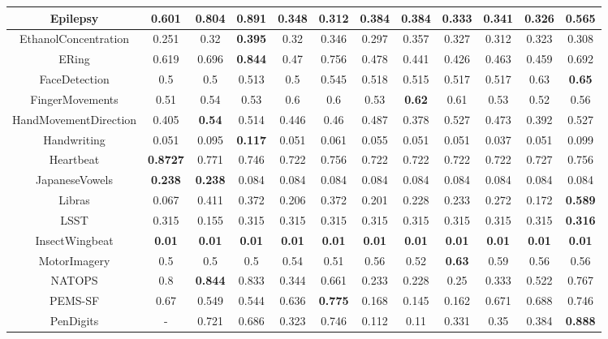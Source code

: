 \documentclass{svproc}
\begin{document}
\begin{table}[ht!]
\begin{adjustbox}{width=1.3\textwidth}
\begin{tabular}{||c@{\hskip 0.1in}c@{\hskip 0.1in}c@{\hskip 0.1in}c@{\hskip 0.1in}c@{\hskip 0.1in}c@{\hskip 0.1in}c@{\hskip 0.1in}c@{\hskip 0.1in}c@{\hskip 0.1in}c@{\hskip 0.1in}c@{\hskip 0.1in}c||}
    \hline
    Epilepsy &  0.601 & 0.804 & \textbf{0.891} & 0.348 & 0.312 & 0.384 & 0.384 & 0.333 & 0.341 & 0.326 & 0.565 \\ 
    \hline
    EthanolConcentration &  0.251 & 0.32 &\textbf{0.395}& 0.32 & 0.346 & 0.297 & 0.357 & 0.327 & 0.312 & 0.323 & 0.308 \\  
    \hline
    ERing&  0.619 & 0.696 &\textbf{0.844}& 0.47 & 0.756 & 0.478 & 0.441 & 0.426 & 0.463 & 0.459 & 0.692 \\  
    \hline
    FaceDetection &  0.5 & 0.5 &0.513& 0.5 & 0.545 & 0.518 & 0.515 & 0.517 & 0.517 & 0.63 & \textbf{0.65} \\ 
    \hline
    FingerMovements &  0.51 & 0.54 & 0.53& 0.6 & 0.6 & 0.53 & \textbf{0.62} & 0.61 & 0.53 & 0.52 & 0.56 \\  
    \hline
    HandMovementDirection &  0.405 & \textbf{0.54} &0.514& 0.446 & 0.46 & 0.487 & 0.378 & 0.527 & 0.473 & 0.392 & 0.527 \\ 
    \hline
    Handwriting &  0.051 & 0.095 &\textbf{0.117}& 0.051 & 0.061 & 0.055 & 0.051 & 0.051 & 0.037 & 0.051 & 0.099 \\ 
    \hline
    Heartbeat &  \textbf{0.8727} & 0.771 &0.746& 0.722 & 0.756 & 0.722 & 0.722 & 0.722 & 0.722 & 0.727 & 0.756 \\  
    \hline
    JapaneseVowels &  \textbf{0.238} & \textbf{0.238} &0.084& 0.084 & 0.084 & 0.084 & 0.084 & 0.084 & 0.084 & 0.084 & 0.084 \\ 
    \hline
    Libras &  0.067 & 0.411 &0.372& 0.206 & 0.372 & 0.201 & 0.228 & 0.233 & 0.272 & 0.172 & \textbf{0.589} \\ 
    \hline
    LSST &  0.315 & 0.155 &0.315& 0.315 & 0.315 & 0.315 & 0.315 & 0.315 & 0.315 & 0.315 & \textbf{0.316} \\  
    \hline
    InsectWingbeat &  \textbf{0.01} & \textbf{0.01} &\textbf{0.01}& \textbf{0.01} & \textbf{0.01} & \textbf{0.01} & \textbf{0.01} & \textbf{0.01} & \textbf{0.01} & \textbf{0.01} & \textbf{0.01} \\  
    \hline
    MotorImagery &  0.5 & 0.5 &0.5& 0.54 & 0.51 & 0.56 & 0.52 & \textbf{0.63} & 0.59 & 0.56 & 0.56 \\ 
    \hline
    NATOPS &  0.8 & \textbf{0.844} &0.833& 0.344 & 0.661 & 0.233 & 0.228 & 0.25 & 0.333 & 0.522 & 0.767 \\ 
    \hline
    PEMS-SF &  0.67 & 0.549 & 0.544& 0.636 & \textbf{0.775} & 0.168 & 0.145 & 0.162 & 0.671 & 0.688 & 0.746 \\ 
    \hline
    PenDigits &  - & 0.721 &0.686& 0.323 & 0.746 & 0.112 & 0.11 & 0.331 & 0.35 & 0.384 & \textbf{0.888} \\  

\end{tabular}
\end{adjustbox}
\end{table}
\end{document}
